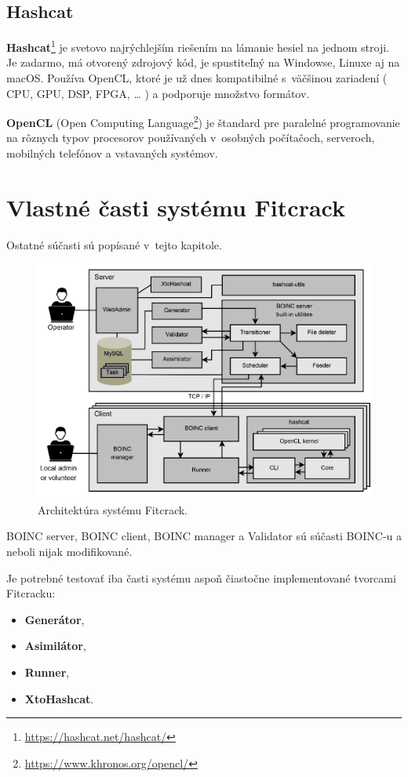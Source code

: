 \subsection{Hashcat}
\label{hashcat}
\textbf{Hashcat}\footnote{\url{https://hashcat.net/hashcat/}} je svetovo najrýchlejším riešením na lámanie hesiel na jednom stroji.
Je zadarmo, má otvorený zdrojový kód, je spustiteľný na Windowse, Linuxe aj na macOS.
Používa OpenCL, ktoré je už dnes kompatibilné s~väčšinou zariadení ( CPU, GPU, DSP, FPGA, … ) a podporuje množstvo formátov.

\textbf{OpenCL} (Open Computing Language\footnote{\url{https://www.khronos.org/opencl/}}) je štandard pre paralelné programovanie na rôznych typov procesorov používaných v~osobných počítačoch, serveroch, mobilných telefónov a vstavaných systémov.


\section{Vlastné časti systému Fitcrack}
\label{Fitcrack_casti}
Ostatné súčasti sú popísané v~tejto kapitole.
\begin{figure}[H]
\centering
\includegraphics[width=\textwidth]{obrazky/fc_arch-1.png}
\caption{Architektúra systému Fitcrack.~\cite{TR_TARZAN}}
\label{fig:fc_arch}
\end{figure}

BOINC server, BOINC client, BOINC manager a Validator sú súčasti BOINC-u a neboli nijak modifikované.

Je potrebné testovať iba časti systému aspoň čiastočne implementované tvorcami Fitcracku:
\begin{itemize}
	\label{tests_moduls}
	\item \textbf{Generátor},
	\item \textbf{Asimilátor},
	\item \textbf{Runner},
	\item \textbf{XtoHashcat}.
\end{itemize}

